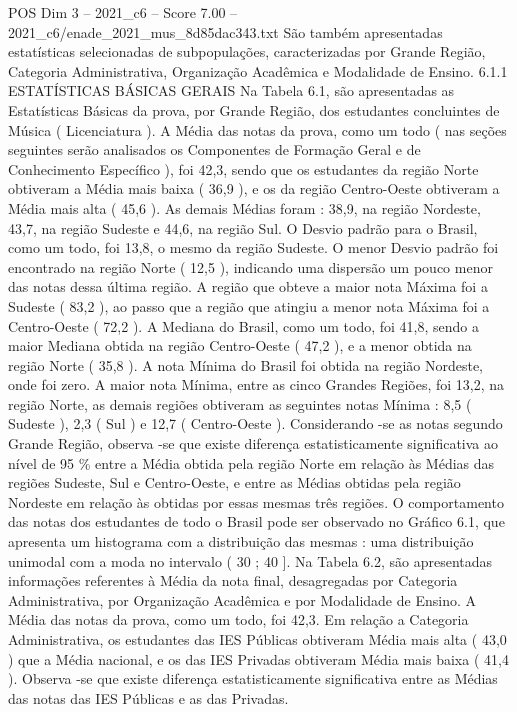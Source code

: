 \begin{textsample}{POS Dim 3 – 2021\_c6 – Score 7.00 – 2021\_c6/enade\_2021\_mus\_8d85dac343.txt}
São também apresentadas estatísticas selecionadas de subpopulações, caracterizadas por Grande Região, Categoria Administrativa, Organização Acadêmica e Modalidade de Ensino. 6.1.1 ESTATÍSTICAS BÁSICAS GERAIS Na Tabela 6.1, são apresentadas as Estatísticas Básicas da prova, por Grande Região, dos estudantes concluintes de Música ( Licenciatura ).
A Média das notas da prova, como um todo ( nas seções seguintes serão analisados os Componentes de Formação Geral e de Conhecimento Específico ), foi 42,3, sendo que os estudantes da região Norte obtiveram a Média mais baixa ( 36,9 ), e os da região Centro-Oeste obtiveram a Média mais alta ( 45,6 ).
As demais Médias foram : 38,9, na região Nordeste, 43,7, na região Sudeste e 44,6, na região Sul.
O Desvio padrão para o Brasil, como um todo, foi 13,8, o mesmo da região Sudeste.
O menor Desvio padrão foi encontrado na região Norte ( 12,5 ), indicando uma dispersão um pouco menor das notas dessa última região.
A região que obteve a maior nota Máxima foi a Sudeste ( 83,2 ), ao passo que a região que atingiu a menor nota Máxima foi a Centro-Oeste ( 72,2 ).
A Mediana do Brasil, como um todo, foi 41,8, sendo a maior Mediana obtida na região Centro-Oeste ( 47,2 ), e a menor obtida na região Norte ( 35,8 ).
A nota Mínima do Brasil foi obtida na região Nordeste, onde foi zero.
A maior nota Mínima, entre as cinco Grandes Regiões, foi 13,2, na região Norte, as demais regiões obtiveram as seguintes notas Mínima : 8,5 ( Sudeste ), 2,3 ( Sul ) e 12,7 ( Centro-Oeste ).
Considerando -se as notas segundo Grande Região, observa -se que existe diferença estatisticamente significativa ao nível de 95 \% entre a Média obtida pela região Norte em relação às Médias das regiões Sudeste, Sul e Centro-Oeste, e entre as Médias obtidas pela região Nordeste em relação às obtidas por essas mesmas três regiões.
O comportamento das notas dos estudantes de todo o Brasil pode ser observado no Gráfico 6.1, que apresenta um histograma com a distribuição das mesmas : uma distribuição unimodal com a moda no intervalo ( 30 ; 40 ].
Na Tabela 6.2, são apresentadas informações referentes à Média da nota final, desagregadas por Categoria Administrativa, por Organização Acadêmica e por Modalidade de Ensino.
A Média das notas da prova, como um todo, foi 42,3.
Em relação a Categoria Administrativa, os estudantes das IES Públicas obtiveram Média mais alta ( 43,0 ) que a Média nacional, e os das IES Privadas obtiveram Média mais baixa ( 41,4 ).
Observa -se que existe diferença estatisticamente significativa entre as Médias das notas das IES Públicas e as das Privadas.

\end{textsample}
